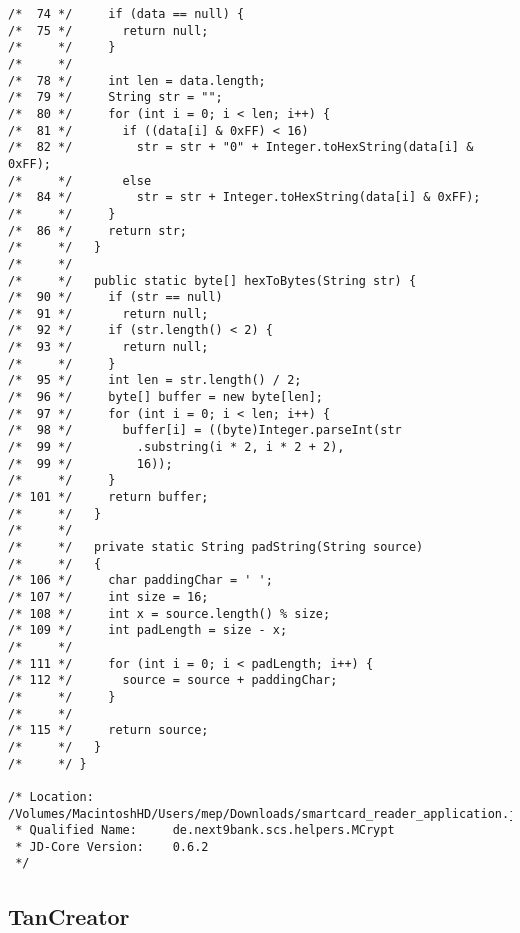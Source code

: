 \begin{lstlisting}
/*  74 */     if (data == null) {
/*  75 */       return null;
/*     */     }
/*     */ 
/*  78 */     int len = data.length;
/*  79 */     String str = "";
/*  80 */     for (int i = 0; i < len; i++) {
/*  81 */       if ((data[i] & 0xFF) < 16)
/*  82 */         str = str + "0" + Integer.toHexString(data[i] & 0xFF);
/*     */       else
/*  84 */         str = str + Integer.toHexString(data[i] & 0xFF);
/*     */     }
/*  86 */     return str;
/*     */   }
/*     */ 
/*     */   public static byte[] hexToBytes(String str) {
/*  90 */     if (str == null)
/*  91 */       return null;
/*  92 */     if (str.length() < 2) {
/*  93 */       return null;
/*     */     }
/*  95 */     int len = str.length() / 2;
/*  96 */     byte[] buffer = new byte[len];
/*  97 */     for (int i = 0; i < len; i++) {
/*  98 */       buffer[i] = ((byte)Integer.parseInt(str
/*  99 */         .substring(i * 2, i * 2 + 2), 
/*  99 */         16));
/*     */     }
/* 101 */     return buffer;
/*     */   }
/*     */ 
/*     */   private static String padString(String source)
/*     */   {
/* 106 */     char paddingChar = ' ';
/* 107 */     int size = 16;
/* 108 */     int x = source.length() % size;
/* 109 */     int padLength = size - x;
/*     */ 
/* 111 */     for (int i = 0; i < padLength; i++) {
/* 112 */       source = source + paddingChar;
/*     */     }
/*     */ 
/* 115 */     return source;
/*     */   }
/*     */ }

/* Location:           /Volumes/MacintoshHD/Users/mep/Downloads/smartcard_reader_application.jar
 * Qualified Name:     de.next9bank.scs.helpers.MCrypt
 * JD-Core Version:    0.6.2
 */
\end{lstlisting}

\subsection{TanCreator}

